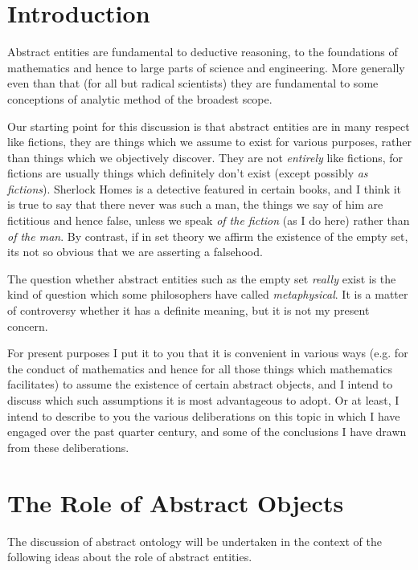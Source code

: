 
\section{Introduction}

Abstract entities are fundamental to deductive reasoning, to the foundations of mathematics and hence to large parts of science and engineering.
More generally even than that (for all but radical scientists) they are fundamental to some conceptions of analytic method of the broadest scope.

Our starting point for this discussion is that abstract entities are in many respect like fictions, they are things which we assume to exist for various purposes, rather than things which we objectively discover.
They are not \emph{entirely} like fictions, for fictions are usually things which definitely don't exist (except possibly \emph{as fictions}).
Sherlock Homes is a detective featured in certain books, and I think it is true to say that there never was such a man, the things we say of him are fictitious and hence false, unless we speak \emph{of the fiction} (as I do here) rather than \emph{of the man}.
By contrast, if in set theory we affirm the existence of the empty set, its not so obvious that we are asserting a falsehood.

The question whether abstract entities such as the empty set {\it really} exist is the kind of question which some philosophers have called  {\it metaphysical}.
It is a matter of controversy whether it has a definite meaning, but it is not my present concern.

For present purposes I put it to you that it is convenient in various ways (e.g. for the conduct of mathematics and hence for all those things which mathematics facilitates) to assume the existence of certain abstract objects, and I intend to discuss which such assumptions it is most advantageous to adopt.
Or at least, I intend to describe to you the various deliberations on this topic in which I have engaged over the past quarter century, and some of the conclusions I have drawn from these deliberations.

\section{The Role of Abstract Objects}

The discussion of abstract ontology will be undertaken in the context of the following ideas about the role of abstract entities.

